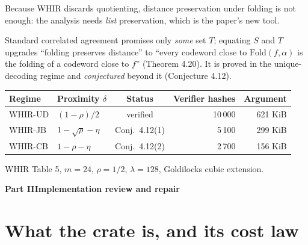 \documentclass[11pt,a4paper]{article}
\newcommand{\ok}{{\color{good}\textsf{\footnotesize verified}}}
\newcommand{\bad}[1]{{\color{signal}\textsf{\footnotesize #1}}}
\newcommand{\warn}[1]{{\color{accent}\textsf{\footnotesize #1}}}
\newcommand{\Fold}{\mathrm{Fold}}
\begin{document}
Because WHIR discards quotienting, distance preservation under folding is not enough: the analysis
needs \emph{list} preservation, which is the paper's new tool.

\medskip
\noindent{}
\medskip

Standard correlated agreement promises only \emph{some} set $T$; equating $S$ and $T$ upgrades
``folding preserves distance'' to ``every codeword close to $\Fold(f,\alpha)$ is the folding of a
codeword close to $f$'' (Theorem 4.20). It is proved in the unique-decoding regime and
\emph{conjectured} beyond it (Conjecture 4.12).

\begin{center}\small
\begin{tabular}{@{}llcrr@{}}
\toprule
\textbf{Regime} & \textbf{Proximity }$\delta$ & \textbf{Status} & \textbf{Verifier hashes} & \textbf{Argument}\\
\midrule
WHIR-UD & $(1-\rho)/2$            & \ok                   & 10\,000 & 621 KiB\\
WHIR-JB & $1-\sqrt{\rho}-\eta$    & \warn{Conj.\ 4.12(1)} & 5\,100 & 299 KiB\\
WHIR-CB & $1-\rho-\eta$           & \bad{Conj.\ 4.12(2)}  & 2\,700 & 156 KiB\\
\bottomrule
\end{tabular}
\end{center}
\begin{center}\footnotesize\color{muted}
WHIR Table 5, $m=24$, $\rho=1/2$, $\lambda=128$, Goldilocks cubic extension.
\end{center}

\clearpage
\begin{center}{\large\bfseries Part II\quad Implementation review and repair}\end{center}
\vspace{-0.5em}
\noindent{\color{rule}\rule{\linewidth}{0.6pt}}

\section{What the crate is, and its cost law}\label{sec:cost}
\end{document}
